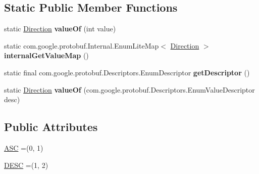 \subsection*{Static Public Member Functions}
\begin{DoxyCompactItemize}
\item 
\mbox{\label{enumcom_1_1mysql_1_1cj_1_1x_1_1protobuf_1_1_mysqlx_crud_1_1_order_1_1_direction_a65c32945b57b0f931479501744b4ad76}} 
static \mbox{\hyperlink{enumcom_1_1mysql_1_1cj_1_1x_1_1protobuf_1_1_mysqlx_crud_1_1_order_1_1_direction}{Direction}} {\bfseries value\+Of} (int value)
\item 
\mbox{\label{enumcom_1_1mysql_1_1cj_1_1x_1_1protobuf_1_1_mysqlx_crud_1_1_order_1_1_direction_ada97f61be0d5e53f8ee9250733289a01}} 
static com.\+google.\+protobuf.\+Internal.\+Enum\+Lite\+Map$<$ \mbox{\hyperlink{enumcom_1_1mysql_1_1cj_1_1x_1_1protobuf_1_1_mysqlx_crud_1_1_order_1_1_direction}{Direction}} $>$ {\bfseries internal\+Get\+Value\+Map} ()
\item 
\mbox{\label{enumcom_1_1mysql_1_1cj_1_1x_1_1protobuf_1_1_mysqlx_crud_1_1_order_1_1_direction_ab5a925a3ee57b48e33c3d28bf1f21d95}} 
static final com.\+google.\+protobuf.\+Descriptors.\+Enum\+Descriptor {\bfseries get\+Descriptor} ()
\item 
\mbox{\label{enumcom_1_1mysql_1_1cj_1_1x_1_1protobuf_1_1_mysqlx_crud_1_1_order_1_1_direction_a677de3acc339860e4408c83a51c5919a}} 
static \mbox{\hyperlink{enumcom_1_1mysql_1_1cj_1_1x_1_1protobuf_1_1_mysqlx_crud_1_1_order_1_1_direction}{Direction}} {\bfseries value\+Of} (com.\+google.\+protobuf.\+Descriptors.\+Enum\+Value\+Descriptor desc)
\end{DoxyCompactItemize}
\subsection*{Public Attributes}
\begin{DoxyCompactItemize}
\item 
\mbox{\hyperlink{enumcom_1_1mysql_1_1cj_1_1x_1_1protobuf_1_1_mysqlx_crud_1_1_order_1_1_direction_a4123976abc9cd988f3437449872a9e61}{A\+SC}} =(0, 1)
\item 
\mbox{\hyperlink{enumcom_1_1mysql_1_1cj_1_1x_1_1protobuf_1_1_mysqlx_crud_1_1_order_1_1_direction_af668de228499341dacde4a5a91d7e3c6}{D\+E\+SC}} =(1, 2)
\end{DoxyCompactItemize}
